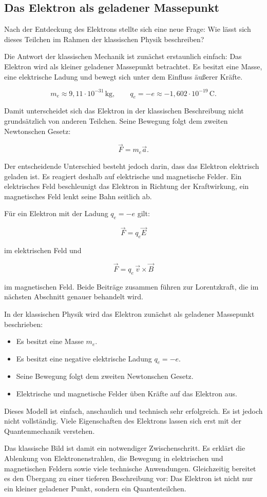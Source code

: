 \subsection{Das Elektron als geladener Massepunkt}
\label{sec:elektron-geladener-massepunkt}

Nach der Entdeckung des Elektrons stellte sich eine neue Frage:
Wie lässt sich dieses Teilchen im Rahmen der klassischen Physik beschreiben?

Die Antwort der klassischen Mechanik ist zunächst erstaunlich einfach:
Das Elektron wird als kleiner geladener Massepunkt betrachtet.
Es besitzt eine Masse, eine elektrische Ladung und bewegt sich unter dem
Einfluss äußerer Kräfte.

\[
m_e \approx 9{,}11 \cdot 10^{-31}\,\mathrm{kg},
\qquad
q_e = -e \approx -1{,}602 \cdot 10^{-19}\,\mathrm{C}.
\]

Damit unterscheidet sich das Elektron in der klassischen Beschreibung
nicht grundsätzlich von anderen Teilchen. Seine Bewegung folgt dem zweiten
Newtonschen Gesetz:

\[
\vec{F} = m_e \vec{a}.
\]

Der entscheidende Unterschied besteht jedoch darin, dass das Elektron
elektrisch geladen ist. Es reagiert deshalb auf elektrische und magnetische
Felder. Ein elektrisches Feld beschleunigt das Elektron in Richtung der
Kraftwirkung, ein magnetisches Feld lenkt seine Bahn seitlich ab.

Für ein Elektron mit der Ladung \(q_e=-e\) gilt:

\[
\vec{F} = q_e \vec{E}
\]

im elektrischen Feld und

\[
\vec{F} = q_e \, \vec{v} \times \vec{B}
\]

im magnetischen Feld. Beide Beiträge zusammen führen zur Lorentzkraft,
die im nächsten Abschnitt genauer behandelt wird.

\begin{DidacticBox}
	\label{box:klassisches-bild-des-elektrons}
	In der klassischen Physik wird das Elektron zunächst als geladener
	Massepunkt beschrieben:
	\begin{itemize}
		\item Es besitzt eine Masse \(m_e\).
		\item Es besitzt eine negative elektrische Ladung \(q_e=-e\).
		\item Seine Bewegung folgt dem zweiten Newtonschen Gesetz.
		\item Elektrische und magnetische Felder üben Kräfte auf das Elektron aus.
	\end{itemize}
	Dieses Modell ist einfach, anschaulich und technisch sehr erfolgreich.
	Es ist jedoch nicht vollständig. Viele Eigenschaften des Elektrons lassen
	sich erst mit der Quantenmechanik verstehen.
\end{DidacticBox}

Das klassische Bild ist damit ein notwendiger Zwischenschritt.
Es erklärt die Ablenkung von Elektronenstrahlen, die Bewegung in
elektrischen und magnetischen Feldern sowie viele technische Anwendungen.
Gleichzeitig bereitet es den Übergang zu einer tieferen Beschreibung vor:
Das Elektron ist nicht nur ein kleiner geladener Punkt, sondern ein
Quantenteilchen.